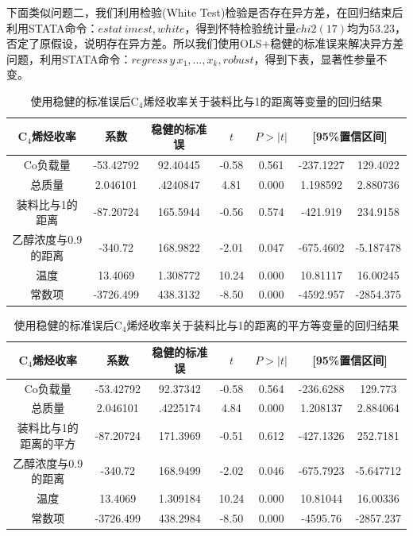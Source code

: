 \documentclass[a4paper,10.5pt]{ctexart}
\begin{document}
\par 下面类似问题二，我们利用检验(White Test)检验是否存在异方差，在回归结束后利用STATA命令：$estat\,imest,white$，得到怀特检验统计量$chi2(17)$均为53.23，否定了原假设，说明存在异方差。所以我们使用OLS+稳健的标准误来解决异方差问题，利用STATA命令：$regress\,y\,x_1,...,x_k,robust$，得到下表，显著性参量不变。
\vspace*{30pt}
\begin{table}[htbp]
  \centering
  \caption{使用稳健的标准误后C$_4$烯烃收率关于装料比与1的距离等变量的回归结果}
    \begin{tabular}{ccccccc}
    \toprule[2pt]
    C$_4$烯烃收率 & 系数    & 稳健的标准误 & $t$ & $P>|t|$ & \multicolumn{2}{p{10em}}{[95\%置信区间]} \\
    \midrule
    Co负载量 & -53.42792 & 92.40445 & -0.58 & 0.561 & -237.1227 & 129.4022 \\
    总质量   & 2.046101  & .4240847 & 4.81  & 0.000 & 1.198592 & 2.880736 \\
    装料比与1的距离 & -87.20724 & 165.5944 & -0.56 & 0.574 & -421.919 & 234.9158 \\
    乙醇浓度与0.9的距离 & -340.72 & 168.9822 & -2.01 & 0.047 & -675.4602 & -5.187478 \\
    温度    & 13.4069  & 1.308772 & 10.24 & 0.000 & 10.81117 & 16.00245 \\
    常数项   & -3726.499 & 438.3132 & -8.50 & 0.000 & -4592.957 & -2854.375 \\
    \bottomrule[2pt]
    \end{tabular}%
  \label{tab:addlabel}%
\end{table}%
\begin{table}[htbp]
  \centering
  \caption{使用稳健的标准误后C$_4$烯烃收率关于装料比与1的距离的平方等变量的回归结果}
    \begin{tabular}{ccccccc}
    \toprule[2pt]
    C$_4$烯烃收率 & 系数    & 稳健的标准误 & $t$ & $P>|t|$ & \multicolumn{2}{p{10em}}{[95\%置信区间]} \\
    \midrule
    Co负载量 & -53.42792 & 92.37342  & -0.58 & 0.564 & -236.6288 & 129.773 \\
    总质量   & 2.046101  & .4225174  & 4.84  & 0.000 & 1.208137 & 2.884064 \\
    装料比与1的距离的平方 & -87.20724 & 171.3969  & -0.51 & 0.612 & -427.1326 & 252.7181 \\
    乙醇浓度与0.9的距离 & -340.72 & 168.9499  & -2.02 & 0.046 & -675.7923 & -5.647712 \\
    温度    & 13.4069  & 1.309184  & 10.24 & 0.000 & 10.81044 & 16.00336 \\
    常数项   & -3726.499 & 438.2984  & -8.50 & 0.000 & -4595.76 & -2857.237 \\
    \bottomrule[2pt]
    \end{tabular}%
  \label{tab:addlabel}%
\end{table}%
\end{document}
